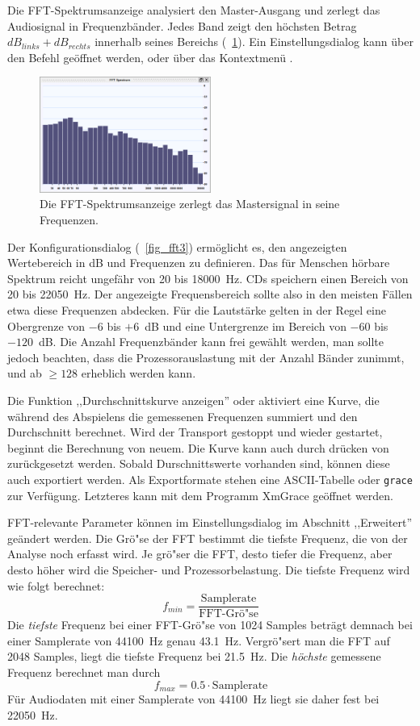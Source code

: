 Die FFT-Spektrumsanzeige analysiert den Master-Ausgang und zerlegt das Audiosignal in Frequenzbänder. Jedes Band zeigt den höchsten Betrag $dB_{links} + dB_{rechts}$ innerhalb seines Bereichs (\FigB\ \ref{fig_fft1}). Ein Einstellungsdialog kann über den Befehl  geöffnet werden, oder über das Kontextmenü .

\begin{figure}
	\centering
	\includegraphics[width=0.5\textwidth]{../images/fft1}
	\caption{Die FFT-Spektrumsanzeige zerlegt das Mastersignal in seine Frequenzen.}
	\label{fig_fft1}
\end{figure}

Der Konfigurationsdialog (\FigB\ \ref{fig_fft3}) ermöglicht es, den angezeigten Wertebereich in dB und Frequenzen zu definieren. Das für Menschen hörbare Spektrum reicht ungefähr von 20 bis 18000~Hz. CDs speichern einen Bereich von 20 bis 22050~Hz. Der angezeigte Frequensbereich sollte also in den meisten Fällen etwa diese Frequenzen abdecken. Für die Lautstärke gelten in der Regel eine Obergrenze von $-6$ bis $+6$~dB und eine Untergrenze im Bereich von $-60$ bis $-120$~dB. Die Anzahl Frequenzbänder kann frei gewählt werden, man sollte jedoch beachten, dass die Prozessorauslastung mit der Anzahl Bänder zunimmt, und ab $\geq 128$ erheblich werden kann.

Die Funktion ,,Durchschnittskurve anzeigen'' oder  aktiviert eine Kurve, die während des Abspielens die gemessenen Frequenzen summiert und den Durchschnitt berechnet. Wird der Transport gestoppt und wieder gestartet, beginnt die Berechnung von neuem. Die Kurve kann auch durch drücken von  zurückgesetzt werden. Sobald Durschnittswerte vorhanden sind, können diese auch exportiert werden. Als Exportformate stehen eine ASCII-Tabelle oder \texttt{grace} zur Verfügung. Letzteres kann mit dem Programm XmGrace geöffnet werden.

FFT-relevante Parameter können im Einstellungsdialog im Abschnitt ,,Erweitert'' geändert werden. Die Grö"se der FFT bestimmt die tiefste Frequenz, die von der Analyse noch erfasst wird. Je grö"ser die FFT, desto tiefer die Frequenz, aber desto höher wird die Speicher- und Prozessorbelastung. Die tiefste Frequenz wird wie folgt berechnet:
\[
f_{min} = \frac{\textrm{Samplerate}}{\textrm{FFT-Grö"se}}
\]
Die \emph{tiefste} Frequenz bei einer FFT-Grö"se von 1024 Samples beträgt demnach bei einer Samplerate von 44100~Hz genau 43.1~Hz. Vergrö"sert man die FFT auf 2048 Samples, liegt die tiefste Frequenz bei 21.5~Hz. Die \emph{höchste} gemessene Frequenz berechnet man durch
\[
f_{max} = 0.5 \cdot \textrm{Samplerate}
\]
Für Audiodaten mit einer Samplerate von 44100~Hz liegt sie daher fest bei 22050~Hz.

